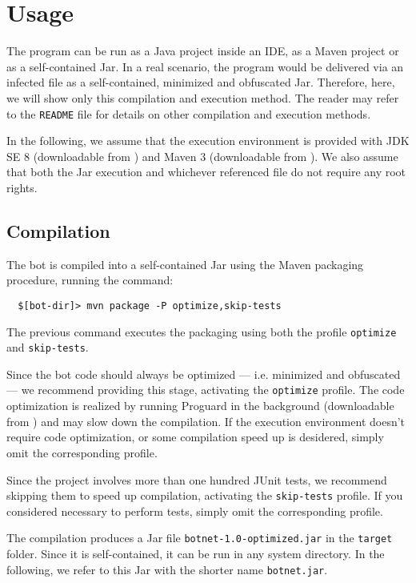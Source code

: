 \section{Usage}
\label{sec:usage}

The program can be run as a Java project inside an IDE, as a Maven project or as a self-contained Jar.
In a real scenario, the program would be delivered via an infected file as a self-contained, minimized and obfuscated Jar. Therefore, here, we will show only this compilation and execution method.
The reader may refer to the \texttt{README} file for details on other compilation and execution methods.

In the following, we assume that the execution environment is provided with JDK SE 8 (downloadable from \cite{jdk}) and Maven 3 (downloadable from \cite{maven}). We also assume that both the Jar execution and whichever referenced file do not require any root rights.

\subsection{Compilation}
\label{sec:compilation}

The bot is compiled into a self-contained Jar using the Maven packaging procedure, running the command:

\begin{verbatim}
  $[bot-dir]> mvn package -P optimize,skip-tests
\end{verbatim}

The previous command executes the packaging using both the profile \texttt{optimize} and \texttt{skip-tests}.

Since the bot code should always be optimized — i.e. minimized and obfuscated — we recommend providing this stage, activating the \texttt{optimize} profile. The code optimization is realized by running Proguard in the background (downloadable from \cite{proguard}) and may slow down the compilation. If the execution environment doesn't require code optimization, or some compilation speed up is desidered, simply omit the corresponding profile.

Since the project involves more than one hundred JUnit tests, we recommend skipping them to speed up compilation, activating the \texttt{skip-tests} profile. If you considered necessary to perform tests, simply omit the corresponding profile.

The compilation produces a Jar file \texttt{botnet-1.0-optimized.jar} in the \texttt{target} folder. Since it is self-contained, it can be run in any system directory. In the following, we refer to this Jar with the shorter name \texttt{botnet.jar}.


